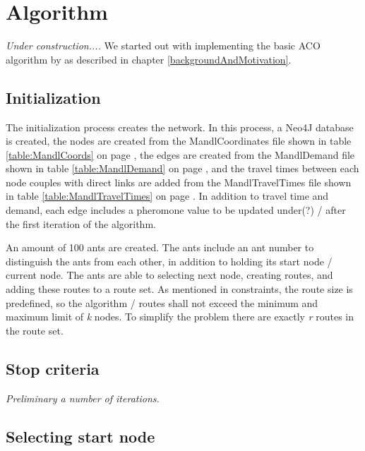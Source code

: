 \section{Algorithm}

 



\textit{Under construction....}
\newline
We started out with implementing the basic ACO algorithm by \citet{nanda11} as described in chapter \ref{backgroundAndMotivation}.

\subsection{Initialization}

The initialization process creates the network. In this process, a Neo4J database is created, the nodes are created from the MandlCoordinates file shown in table \ref{table:MandlCoords} on page \pageref{table:MandlCoords}, the edges are created from the MandlDemand file shown in table \ref{table:MandlDemand} on page \pageref{table:MandlDemand}, and the travel times between each node couples with direct links are added from the MandlTravelTimes file shown in table \ref{table:MandlTravelTimes} on page \pageref{table:MandlTravelTimes}. In addition to travel time and demand, each edge includes a pheromone value to be updated under(?) / after the first iteration of the algorithm.
\par
An amount of 100 ants are created. The ants include an ant number to distinguish the ants from each other, in addition to holding its start node / current node. The ants are able to selecting next node, creating routes, and adding these routes to a route set. As mentioned in constraints, the route size is predefined, so the algorithm / routes shall not exceed the minimum and maximum limit of \textit{k} nodes. To simplify the problem there are exactly \textit{r} routes in the route set.

\subsection{Stop criteria}

\textit{Preliminary a number of iterations. }

\subsection{Selecting start node}
\begin{algorithm}[H]

 
\end{algorithm}

